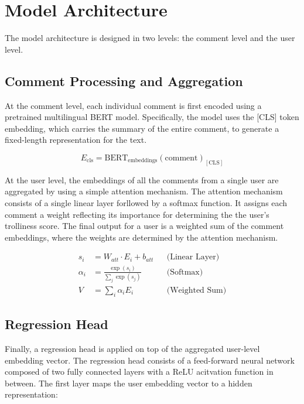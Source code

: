 \documentclass[twoside]{ctuthesis}
\theoremstyle{plain}
\theoremstyle{definition}
\theoremstyle{note}
\begin{document}
\section{Model Architecture}
The model architecture is designed in two levels: the comment level and the user level. 

\subsection{Comment Processing and Aggregation}

At the comment level, each individual comment is first encoded using a pretrained multilingual BERT model. Specifically, the model uses the [CLS] token embedding, which carries the summary of the entire comment, to generate a fixed-length representation for the text.\par

\begin{equation}
    E_{\text{cls}} = \text{BERT}_{\text{embeddings}}(\text{comment})_{[\text{CLS}]}
\end{equation}

At the user level, the embeddings of all the comments from a single user are aggregated by using a simple attention mechanism. The attention mechanism consists of a single linear layer forllowed by a softmax function. It assigns each comment a weight reflecting its importance for determining the the user's trolliness score. The final output for a user is a weighted sum of the comment embeddings, where the weights are determined by the attention mechanism.

\begin{align}
	s_i &= W_{att} \cdot E_i + b_{att} && \text{(Linear Layer)} \\
	\alpha_i &= \frac{\exp(s_i)}{\sum_{j} \exp(s_j)} && \text{(Softmax)} \\
	V &= \sum_i \alpha_i E_i && \text{(Weighted Sum)}
\end{align}

\subsection{Regression Head}

Finally, a regression head is applied on top of the aggregated user-level embedding vector. The regression head consists of a feed-forward neural network composed of two fully connected layers with a ReLU acitvation function in between. The first layer maps the user embedding vector to a hidden representation:
\end{document}
